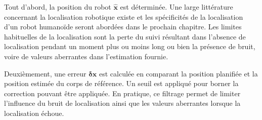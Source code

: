 Tout d'abord, la position du robot $\hat{\mathbf{x}}$ est
déterminée. Une large littérature concernant la localisation robotique
existe \cite{08stasse.ijhr, 06thompson.humanoids} et les spécificités
de la localisation d'un robot humanoïde seront abordées dans le
prochain chapitre. Les limites habituelles de la localisation sont la
perte du suivi résultant dans l'absence de localisation pendant un
moment plus ou moins long ou bien la présence de bruit, voire de
valeurs aberrantes dans l'estimation fournie.

Deuxièmement, une erreur $\mathbf{\delta \mathbf{x}}$ est calculée en
comparant la position planifiée et la position estimée du corps de
référence. Un seuil est appliqué pour borner la correction pouvant
être appliquée. En pratique, ce filtrage permet de limiter l'influence
du bruit de localisation ainsi que les valeurs aberrantes lorsque la
localisation échoue.


